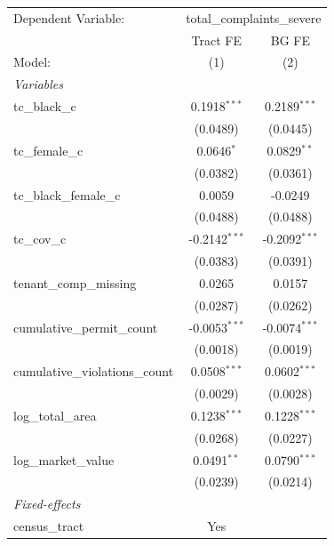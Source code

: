 \begin{tabular}{lcc}
   \tabularnewline \midrule \midrule
   Dependent Variable: & \multicolumn{2}{c}{total\_complaints\_severe}\\
                                   & Tract FE        & BG FE \\   
   Model:                          & (1)             & (2)\\  
   \midrule
   \emph{Variables}\\
   tc\_black\_c                    & 0.1918$^{***}$  & 0.2189$^{***}$\\   
                                   & (0.0489)        & (0.0445)\\   
   tc\_female\_c                   & 0.0646$^{*}$    & 0.0829$^{**}$\\   
                                   & (0.0382)        & (0.0361)\\   
   tc\_black\_female\_c            & 0.0059          & -0.0249\\   
                                   & (0.0488)        & (0.0488)\\   
   tc\_cov\_c                      & -0.2142$^{***}$ & -0.2092$^{***}$\\   
                                   & (0.0383)        & (0.0391)\\   
   tenant\_comp\_missing           & 0.0265          & 0.0157\\   
                                   & (0.0287)        & (0.0262)\\   
   cumulative\_permit\_count       & -0.0053$^{***}$ & -0.0074$^{***}$\\   
                                   & (0.0018)        & (0.0019)\\   
   cumulative\_violations\_count   & 0.0508$^{***}$  & 0.0602$^{***}$\\   
                                   & (0.0029)        & (0.0028)\\   
   log\_total\_area                & 0.1238$^{***}$  & 0.1228$^{***}$\\   
                                   & (0.0268)        & (0.0227)\\   
   log\_market\_value              & 0.0491$^{**}$   & 0.0790$^{***}$\\   
                                   & (0.0239)        & (0.0214)\\   
   \midrule
   \emph{Fixed-effects}\\
   census\_tract                   & Yes             & \\  

\end{tabular}
